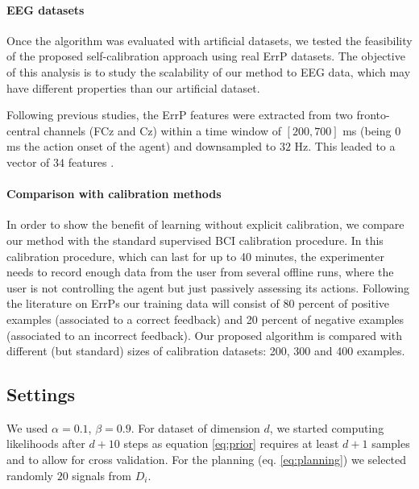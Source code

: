 \paragraph{EEG datasets}
Once the algorithm was evaluated with artificial datasets, we tested the feasibility of the proposed self-calibration approach using real ErrP datasets. The objective of this analysis is to study the scalability of our method to EEG data, which may have different properties than our artificial dataset. 

Following previous studies, the ErrP features were extracted from two fronto-central channels (FCz and Cz) within a time window of $[200,700]$ ms (being 0 ms the action onset of the agent) and downsampled to $32$ Hz. This leaded to a vector of $34$ features \cite{iturrate2013task}.

\paragraph{Comparison with calibration methods}
In order to show the benefit of learning without explicit calibration, we compare our method with the standard supervised BCI calibration procedure. In this calibration procedure, which can last for up to 40 minutes, the experimenter needs to record enough data from the user from several offline runs, where the user is not controlling the agent but just passively assessing its actions.
%
Following the literature on ErrPs \cite{chavarriaga2010learning,iturrate2013task} our training data will consist of 80 percent of positive examples (associated to a correct feedback) and 20 percent of negative examples (associated to an incorrect feedback). Our proposed algorithm is compared with different (but standard) sizes of calibration datasets: 200, 300 and 400 examples.

\subsection{Settings}

We used $\alpha = 0.1$, $\beta = 0.9$. For dataset of dimension $d$, we started computing likelihoods after $d+10$ steps as equation \ref{eq:prior} requires at least $d+1$ samples and to allow for cross validation. For the planning (eq. \ref{eq:planning}) we selected randomly $20$ signals from $D_i$.

